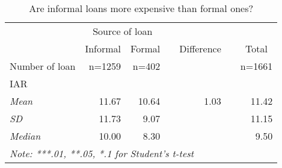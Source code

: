 \begin{table}[htbp]
  \center
  \caption{Are informal loans more expensive than formal ones?}
    \begin{tabular}{lllllll}
    \toprule
          & \multicolumn{2}{c}{Source of loan} &       &       &       &  \\
\cmidrule{2-3}          & \multicolumn{1}{c}{Informal} & \multicolumn{1}{c}{Formal} &       & \multicolumn{1}{c}{Difference} &       & \multicolumn{1}{c}{Total} \\
    \midrule
    Number of loan & \multicolumn{1}{r}{n=1259} & \multicolumn{1}{r}{n=402} &       &       &       & \multicolumn{1}{r}{n=1661} \\
    IAR   &       &       &       &       &       &  \\
    \hspace*{0.2cm} \textit{Mean} & \multicolumn{1}{r}{11.67} & \multicolumn{1}{r}{10.64} &       & \multicolumn{1}{r}{1.03} &       & \multicolumn{1}{r}{11.42} \\
    \hspace*{0.2cm} \textit{SD} & \multicolumn{1}{r}{11.73} & \multicolumn{1}{r}{9.07} &       &       &       & \multicolumn{1}{r}{11.15} \\
    \hspace*{0.2cm} \textit{Median} & \multicolumn{1}{r}{10.00} & \multicolumn{1}{r}{8.30} &       &       &       & \multicolumn{1}{r}{9.50} \\
    \midrule
    \multicolumn{7}{l}{\textit{Note: ***.01, **.05, *.1 for Student's t-test}} \\
    \end{tabular}%
  \label{appendix:student}%
\end{table}%
